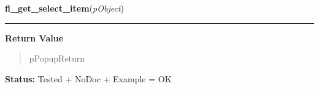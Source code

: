     \vspace{0.5ex}

\hspace{.8\funcindent}\begin{boxedminipage}{\funcwidth}

    \raggedright \textbf{fl\_get\_select\_item}(\textit{pObject})

    \vspace{-1.5ex}

    \rule{\textwidth}{0.5\fboxrule}
\setlength{\parskip}{2ex}
\setlength{\parskip}{1ex}
      \textbf{Return Value}
    \vspace{-1ex}

      \begin{quote}
      pPopupReturn

      \end{quote}

\textbf{Status:} Tested + NoDoc + Example = OK



    \end{boxedminipage}

    \label{xformslib:library:fl_set_select_item}

    \vspace{0.5ex}

